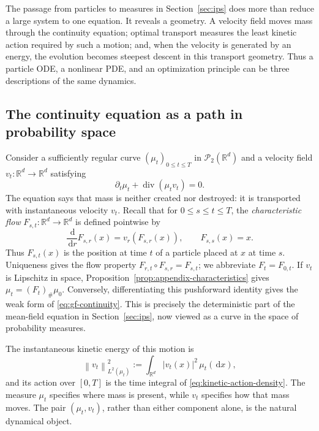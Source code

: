 \documentclass[11pt]{amsart}
\numberwithin{equation}{section}
\theoremstyle{plain}
\newcommand{\R}{\mathbb{R}}
\newcommand{\cP}{\mathcal{P}}
\newcommand{\dd}{\,\mathrm{d}}
\newcommand{\abs}[1]{\left\lvert#1\right\rvert}
\newcommand{\norm}[1]{\left\lVert#1\right\rVert}
\DeclareMathOperator{\diver}{div}
\begin{document}
The passage from particles to measures in Section~\ref{sec:ips} does more than reduce a large system to one equation.  It reveals a geometry.  A velocity
field moves mass through the continuity equation; optimal transport measures
the least kinetic action required by such a motion; and, when the velocity is
generated by an energy, the evolution becomes steepest descent in this
transport geometry.  Thus a particle ODE, a nonlinear PDE, and an optimization
principle can be three descriptions of the same dynamics.

\subsection{The continuity equation as a path in probability space}

Consider a sufficiently regular curve $(\mu_t)_{0\leq t\leq T}$ in
$\cP_2(\R^d)$ and a velocity field $v_t:\R^d\to\R^d$ satisfying
\begin{equation}\label{eq:gf-continuity}
 \partial_t\mu_t+\diver(\mu_t v_t)=0.
\end{equation}
The equation says that mass is neither created nor destroyed: it is transported
with instantaneous velocity $v_t$.
Recall that for $0\leq s\leq t\leq T$, the \emph{characteristic flow}
$F_{s,t}:\R^d\to\R^d$ is defined pointwise by
\[
 \frac{\dd}{\dd r}F_{s,r}(x)=v_r(F_{s,r}(x)),\qquad F_{s,s}(x)=x.
\]
Thus $F_{s,t}(x)$ is the position at time $t$ of a particle placed at $x$ at
time $s$.  Uniqueness gives the flow property
$F_{r,t}\circ F_{s,r}=F_{s,t}$; we abbreviate $F_t=F_{0,t}$.
If $v_t$ is Lipschitz in space, Proposition~\ref{prop:appendix-characteristics}
gives $\mu_t=(F_t)_\#\mu_0$.  Conversely, differentiating this pushforward
identity gives the weak form of \eqref{eq:gf-continuity}.  This is precisely
the deterministic part of the mean-field equation in
Section~\ref{sec:ips}, now viewed as
a curve in the space of probability measures.

The instantaneous kinetic energy of this motion is
\begin{equation}\label{eq:kinetic-action-density}
 \norm{v_t}_{L^2(\mu_t)}^2
 :=\int_{\R^d}\abs{v_t(x)}^2\,\mu_t(\dd x),
\end{equation}
and its action over $[0,T]$ is the time integral of
\eqref{eq:kinetic-action-density}.  The measure $\mu_t$ specifies where mass
is present, while $v_t$ specifies how that mass moves.  The pair
$(\mu_t,v_t)$, rather than either component alone, is the natural dynamical
object.
\end{document}
